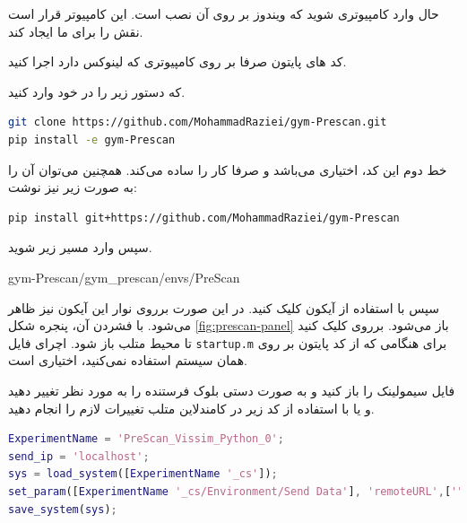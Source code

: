 حال وارد کامپیوتری شوید که ویندوز بر روی آن نصب است. این کامپیوتر قرار است نقش 
را برای ما ایجاد کند. 
\begin{note}
	کد های پایتون صرفا بر روی کامپیوتری که لینوکس دارد اجرا کنید.
\end{note}
 که دستور زیر را در  خود وارد کنید.

\begin{latin}
\begin{lstlisting}[language=bash]
git clone https://github.com/MohammadRaziei/gym-Prescan.git
pip install -e gym-Prescan
\end{lstlisting}
\end{latin}

خط دوم این کد، اختیاری می‌باشد و صرفا کار را ساده می‌کند. همچنین می‌توان آن را به صورت زیر نیز نوشت:

\begin{latin}
\begin{lstlisting}[language=bash]
pip install git+https://github.com/MohammadRaziei/gym-Prescan
\end{lstlisting}
\end{latin}

سپس وارد مسیر زیر شوید.
\begin{center}
\begin{latin}
gym-Prescan/gym\_prescan/envs/PreScan
\end{latin}
\end{center}

سپس با استفاده از آیکون 
کلیک کنید. در این صورت برروی نوار  این آیکون نیز ظاهر می‌شود. با فشردن آن،
 پنجره شکل 
\ref{fig:prescan-panel}
باز می‌شود. برروی  کلیک کنید تا محیط متلب باز شود. اچرای فایل \texttt{startup.m} برای هنگامی که از کد پایتون بر روی همان سیستم استفاده نمی‌کنید، اختیاری است. 

فایل سیمولینک را باز کنید و به صورت دستی  بلوک فرستنده را به  مورد نظر تغییر دهید و یا با استفاده از کد زیر در کامندلاین متلب تغییرات لازم را انجام دهید.

\begin{latin}
\begin{lstlisting}[language=matlab]
ExperimentName = 'PreScan_Vissim_Python_0';
send_ip = 'localhost';
sys = load_system([ExperimentName '_cs']);
set_param([ExperimentName '_cs/Environment/Send Data'], 'remoteURL',['"' send_ip '"']);
save_system(sys);
\end{lstlisting}
\end{latin}

